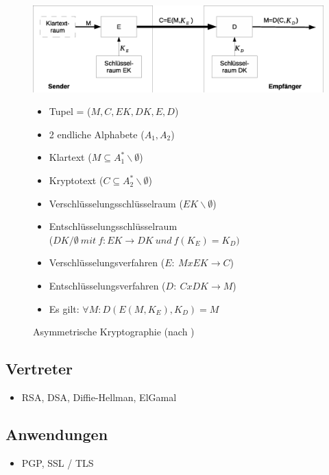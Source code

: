 \documentclass[10pt,a4paper]{article}
\begin{document}
\begin{figure}[ht]
\begin{minipage}[c]{0.60\linewidth}
\centering
\includegraphics[width=\textwidth]{async.eps}
\caption{Asymmetrische Kryptographie (nach \cite{Eckert13})}
\end{minipage}
\begin{minipage}[c]{0.40\linewidth}
\centering
\small
\begin{itemize}
\itemsep0pt
\item Tupel = ($M,C,EK,DK,E,D$)
\item 2 endliche Alphabete ($A_1,A_2$)
\item Klartext ($M \subseteq A^*_1\backslash\emptyset$)
\item Kryptotext ($C \subseteq A^*_2\backslash\emptyset$)
\item Verschlüsselungsschlüsselraum ($EK\backslash\emptyset$)
\item Entschlüsselungsschlüsselraum\\
($DK/\emptyset~mit~f:EK \rightarrow DK ~und~ f(K_E)=K_D)$
\item Verschlüsselungsverfahren ($E :~ M x EK \rightarrow C$)
\item Entschlüsselungsverfahren ($D :~ C x DK \rightarrow M$)
\item Es gilt: $\forall M : D(E(M,K_E),K_D) = M$
\end{itemize}
\end{minipage}
\end{figure}

\subsection{Vertreter}
\begin{itemize}
\item RSA, DSA, Diffie-Hellman, ElGamal
\end{itemize}

\subsection{Anwendungen}
\begin{itemize}
\item PGP, SSL / TLS
\end{itemize}
\end{document}
